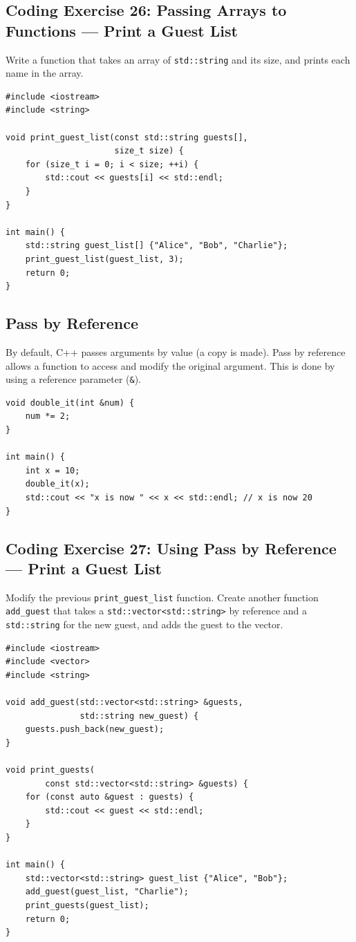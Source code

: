 \subsection{Coding Exercise 26: Passing Arrays to Functions --- Print a Guest List}
Write a function that takes an array of \texttt{std::string} and its size, and prints each name in the array.
\begin{lstlisting}
#include <iostream>
#include <string>

void print_guest_list(const std::string guests[],
                      size_t size) {
	for (size_t i = 0; i < size; ++i) {
		std::cout << guests[i] << std::endl;
	}
}

int main() {
	std::string guest_list[] {"Alice", "Bob", "Charlie"};
	print_guest_list(guest_list, 3);
	return 0;
}
\end{lstlisting}

\subsection{Pass by Reference}
By default, C++ passes arguments by value (a copy is made). Pass by reference allows a function to access and modify the original argument. This is done by using a reference parameter (\texttt{\&}).
\begin{lstlisting}
void double_it(int &num) {
	num *= 2;
}

int main() {
	int x = 10;
	double_it(x);
	std::cout << "x is now " << x << std::endl; // x is now 20
}
\end{lstlisting}

\subsection{Coding Exercise 27: Using Pass by Reference --- Print a Guest List}
Modify the previous \texttt{print\_guest\_list} function. Create another function \texttt{add\_guest} that takes a \texttt{std::vector<std::string>} by reference and a \texttt{std::string} for the new guest, and adds the guest to the vector.
\begin{lstlisting}
#include <iostream>
#include <vector>
#include <string>

void add_guest(std::vector<std::string> &guests,
               std::string new_guest) {
	guests.push_back(new_guest);
}

void print_guests(
		const std::vector<std::string> &guests) {
	for (const auto &guest : guests) {
		std::cout << guest << std::endl;
	}
}

int main() {
	std::vector<std::string> guest_list {"Alice", "Bob"};
	add_guest(guest_list, "Charlie");
	print_guests(guest_list);
	return 0;
}
\end{lstlisting}


